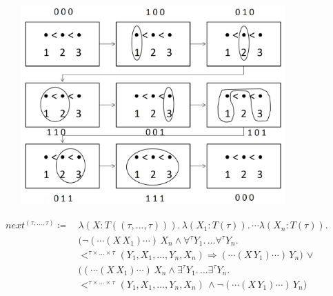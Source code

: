 \begin{frame}
\begin{figure}[ht]
{  }
\end{figure}

\end{frame}
\begin{frame}

\begin{figure}[ht]
	\centering
  \includegraphics[width=0.9\textwidth]{next-set.png}
\end{figure}

\end{frame}
\begin{frame}

    \begin{align*}
        next^{(\tau, \dots, \tau)} \coloneqq &\,\lambda (X \colon T ((\tau, \dots, \tau))).\,\lambda (X_1 \colon T(\tau)).\, \dotsb \lambda (X_n \colon T(\tau)).\, \\&\,
        \big(\neg (\dotsb(X\,X_1)\dotsb)\,X_n \wedge \forall^{\tau}Y_1.\, \dots \forall^{\tau}Y_n.\,\\&\,<^{\tau \times
        \dots \times \tau}(Y_1, X_1, \dots, Y_n, X_n) \Rightarrow  (\dotsb(X\,Y_1)\dotsb)\,Y_n\big) \,\vee
        \\&\,\big((\dotsb (X\,X_1) \dotsb)\,X_n \wedge \exists^{\tau}Y_1.\, \dots \exists^{\tau}Y_n.\, \\&\,
        <^{\tau \times \dots \times \tau}
        (Y_1, X_1, \dots, Y_n, X_n)\,\wedge \neg (\dotsb(X\,Y_1)\dotsb)\,Y_n\big)
    \end{align*}

\end{frame}
